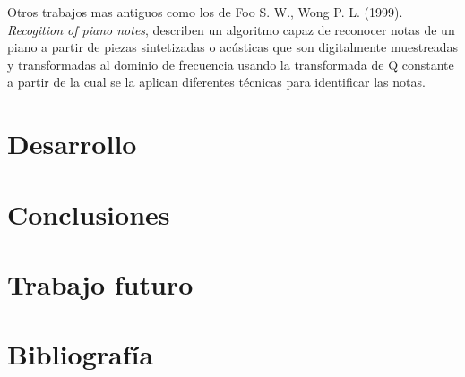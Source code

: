 \documentclass[12pt]{article}
\begin{document}
\bigskip
Otros trabajos mas antiguos como los de Foo S. W., Wong P. L. (1999). \textit{Recogition of piano notes}, describen un algoritmo capaz de reconocer notas
de un piano a partir de piezas sintetizadas o acústicas que son digitalmente muestreadas y transformadas al dominio de frecuencia usando 
la transformada de Q constante a partir de la cual se la aplican diferentes técnicas para identificar las notas.



\section{Desarrollo}
\label{Desarrollo}

\section{Conclusiones}
\label{Conclusiones}

\section{Trabajo futuro}
\label{Trabajo futuro}

\section{Bibliografía}
\label{Bibliografía}
\end{document}
